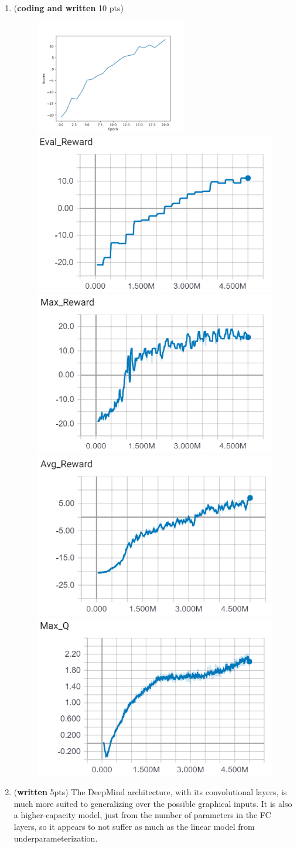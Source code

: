 \documentclass{article}
\begin{document}
\begin{enumerate}
\item (\textbf{coding and written} 10 pts)
\begin{figure}[H]
	\centering
	\includegraphics[width=.61\linewidth,height=5cm]{atari-scores}
	\includegraphics[width=.4\linewidth]{atari-eval-reward}
	\includegraphics[width=.4\linewidth]{atari-max-reward}
	\includegraphics[width=.4\linewidth]{atari-avg-reward}
	\includegraphics[width=.4\linewidth]{atari-max-q}
\end{figure}

\item (\textbf{written} 5pts) The DeepMind architecture, with its convolutional layers, is much more suited to generalizing over the possible graphical inputs. It is also a higher-capacity model, just from the number of parameters in the FC layers, so it appears to not suffer as much as the linear model from underparameterization.
\end{enumerate}
\end{document}
